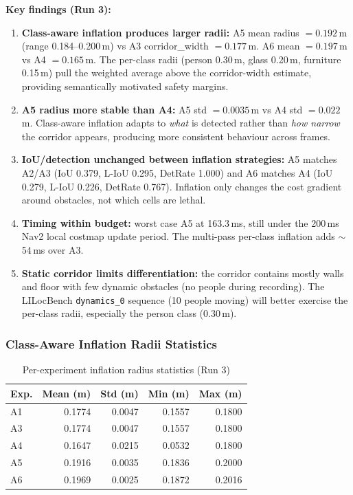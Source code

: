 \documentclass[11pt,a4paper]{article}
\begin{document}
\textbf{Key findings (Run 3):}
\begin{enumerate}[nosep]
  \item \textbf{Class-aware inflation produces larger radii:} A5 mean radius
    $= 0.192$\,m (range 0.184--0.200\,m) vs A3 corridor\_width $= 0.177$\,m.
    A6 mean $= 0.197$\,m vs A4 $= 0.165$\,m. The per-class radii (person 0.30\,m,
    glass 0.20\,m, furniture 0.15\,m) pull the weighted average above the
    corridor-width estimate, providing semantically motivated safety margins.

  \item \textbf{A5 radius more stable than A4:} A5 std $= 0.0035$\,m vs
    A4 std $= 0.022$\,m. Class-aware inflation adapts to \emph{what} is detected
    rather than \emph{how narrow} the corridor appears, producing more consistent
    behaviour across frames.

  \item \textbf{IoU/detection unchanged between inflation strategies:} A5 matches
    A2/A3 (IoU 0.379, L-IoU 0.295, DetRate 1.000) and A6 matches A4 (IoU 0.279,
    L-IoU 0.226, DetRate 0.767). Inflation only changes the cost gradient
    around obstacles, not which cells are lethal.

  \item \textbf{Timing within budget:} worst case A5 at 163.3\,ms, still
    under the 200\,ms Nav2 local costmap update period. The multi-pass
    per-class inflation adds $\sim$54\,ms over A3.

  \item \textbf{Static corridor limits differentiation:} the corridor contains
    mostly walls and floor with few dynamic obstacles (no people during recording).
    The LILocBench \texttt{dynamics\_0} sequence (10 people moving) will better
    exercise the per-class radii, especially the person class (0.30\,m).
\end{enumerate}

\subsubsection{Class-Aware Inflation Radii Statistics}

\begin{table}[h]
\centering
\caption{Per-experiment inflation radius statistics (Run 3)}
\label{tab:radius-stats}
\begin{tabular}{lrrrr}
\toprule
\textbf{Exp.} & \textbf{Mean (m)} & \textbf{Std (m)} & \textbf{Min (m)} & \textbf{Max (m)} \\
\midrule
A1 & 0.1774 & 0.0047 & 0.1557 & 0.1800 \\
A3 & 0.1774 & 0.0047 & 0.1557 & 0.1800 \\
A4 & 0.1647 & 0.0215 & 0.0532 & 0.1800 \\
A5 & 0.1916 & 0.0035 & 0.1836 & 0.2000 \\
A6 & 0.1969 & 0.0025 & 0.1872 & 0.2016 \\
\bottomrule
\end{tabular}
\end{table}
\end{document}
